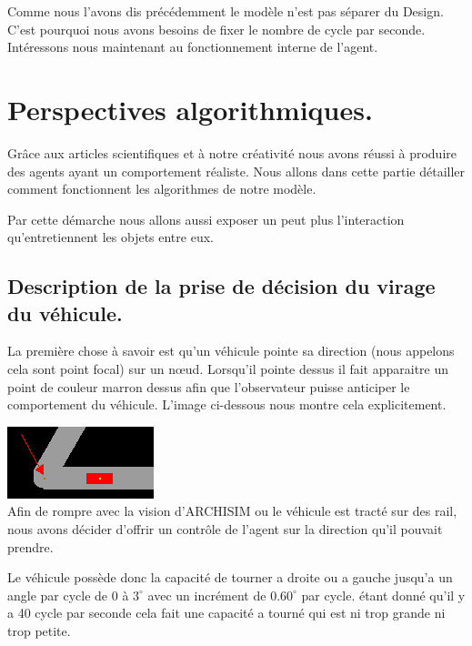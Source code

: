 \documentclass[a4paper,11pt]{article}
\newcommand{\orto}{^{\circ}}
\begin{document}
Comme nous l'avons dis précédemment le modèle n'est pas séparer du Design. C'est pourquoi nous avons besoins de fixer le nombre de cycle par seconde. \\

Intéressons nous maintenant au fonctionnement interne de l'agent.

\section{Perspectives algorithmiques.}

Grâce aux articles scientifiques et à notre créativité nous avons réussi à produire des agents ayant un comportement réaliste. Nous allons dans cette partie détailler comment fonctionnent les algorithmes de notre modèle.

Par cette démarche nous allons aussi exposer un peut plus l'interaction qu'entretiennent les objets entre eux.

\subsection{Description de la prise de décision du virage du véhicule.}

La première chose à savoir est qu'un véhicule pointe sa direction (nous appelons cela sont point focal) sur un n\oe{}ud. Lorsqu'il pointe dessus il fait apparaitre un point de couleur marron dessus afin que l'observateur puisse anticiper le comportement du véhicule. L'image ci-dessous nous montre cela explicitement.

\vspace{0.2cm}

\includegraphics[scale=0.7]{imgAlgo/pointe.png}\\

Afin de rompre avec la vision d'ARCHISIM ou le véhicule est tracté sur des rail, nous avons décider d'offrir un contrôle de l'agent sur la direction qu'il pouvait prendre.

Le véhicule possède donc la capacité de tourner a droite ou a gauche jusqu'a un angle par cycle de $0$ à $3\orto$ avec un incrément de $0.60\orto$ par cycle. étant donné qu'il y a 40 cycle par seconde cela fait une capacité a tourné qui est ni trop grande ni trop petite.
\end{document}
